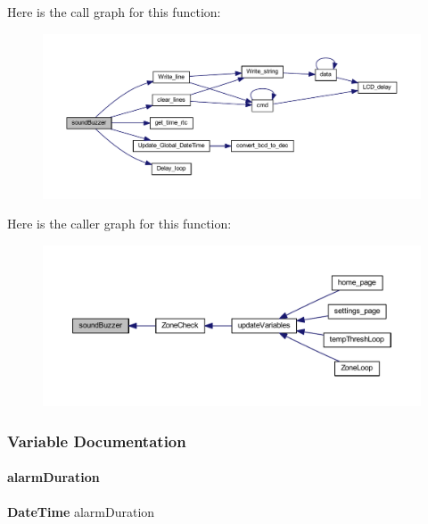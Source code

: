 Here is the call graph for this function\+:
\nopagebreak
\begin{figure}[H]
\begin{center}
\leavevmode
\includegraphics[width=350pt]{a00008_a31aed89a0638f80bd71a31c50f5cb3ff_cgraph}
\end{center}
\end{figure}
Here is the caller graph for this function\+:
\nopagebreak
\begin{figure}[H]
\begin{center}
\leavevmode
\includegraphics[width=350pt]{a00008_a31aed89a0638f80bd71a31c50f5cb3ff_icgraph}
\end{center}
\end{figure}


\subsubsection{Variable Documentation}
\mbox{\label{a00008_a01c2a28170e998893c6428276cb87ae2}} 
\paragraph{alarm\+Duration}
{\footnotesize\ttfamily \textbf{ Date\+Time} alarm\+Duration}

\mbox{\label{a00008_ab073eeb8d5a2147ef91fab51d73ab4b2}} 
